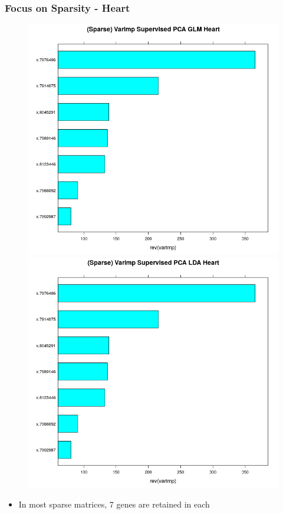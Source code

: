 \documentclass[11pt]{beamer}
\begin{document}
\begin{frame}
\frametitle{Focus on Sparsity - Heart}
{
\begin{figure}
\includegraphics[scale=0.2]{heartVarImp_glmSparse.png}
\includegraphics[scale=0.2]{heartVarImp_lda_Sparse.png}
\end{figure}

\begin{itemize}
\item In most sparse matrices, 7 genes are retained in each
\end{itemize}
}
\end{frame}
\end{document}
